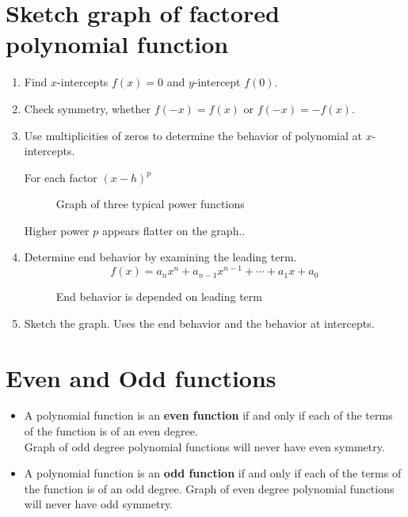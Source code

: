\section{Sketch graph of factored polynomial function}
\begin{enumerate}
    \item Find $x$-intercepts $f(x)=0$ and $y$-intercept $f(0)$.
    \item Check symmetry, whether $f(-x)=f(x)$ or $f(-x)=-f(x)$.
    \item Use multiplicities of zeros  to determine the behavior of polynomial at $x$-intercepts.

        For each factor $(x-h)^p$
        \begin{figure}[H]
            \centering
            \caption{Graph of three typical power functions}
        \end{figure}
        Higher power $p$ appears flatter on the graph..
    \item Determine end behavior by examining the leading term.
        \[
            f(x)=a_n x^n+a_{n-1}x^{n-1}+\cdots+a_1 x+a_0
        \]
        \begin{figure}[H]
            \centering
            \caption{End behavior is depended on leading term}
        \end{figure}
    \item Sketch the graph. Uses the end behavior and the behavior at intercepts.
\end{enumerate}

\section{Even and Odd functions}
\begin{itemize}
    \item A polynomial function is an \textbf{even function} if and only if each of the terms of the function is of an even degree. \\
        Graph of odd degree polynomial functions will never have even symmetry.
    \item A polynomial function is an \textbf{odd function} if and only if each of the terms of the function is of an odd degree.
        Graph of even degree polynomial functions will never have odd symmetry.
\end{itemize}

